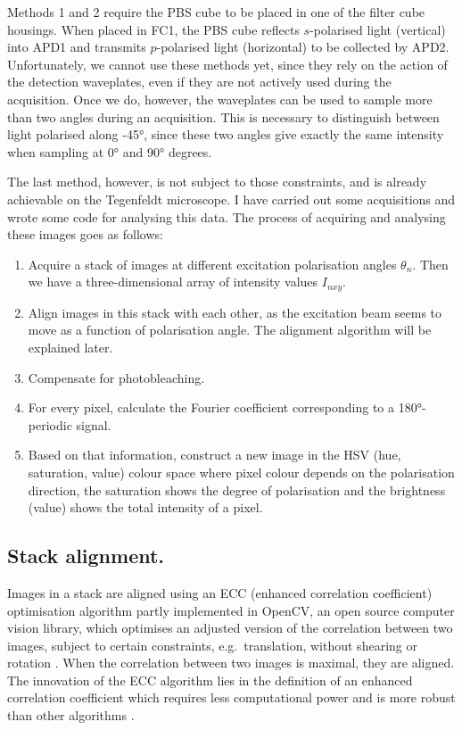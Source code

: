 Methods 1 and 2 require the PBS cube to be placed in one of the filter cube housings. When placed in FC1, the PBS cube reflects $ s $-polarised light (vertical) into APD1 and transmits $ p $-polarised light (horizontal) to be collected by APD2. Unfortunately, we cannot use these methods yet, since they rely on the action of the detection waveplates, even if they are not actively used during the acquisition. Once we do, however, the waveplates can be used to sample more than two angles during an acquisition. This is necessary to distinguish between light polarised along \ang{+-45}, since these two angles give exactly the same intensity when sampling at \ang{0} and \ang{90} degrees.

The last method, however, is not subject to those constraints, and is already achievable on the Tegenfeldt microscope. I have carried out some acquisitions and wrote some code for analysing this data. The process of acquiring and analysing these images goes as follows:
\begin{enumerate}
	\item Acquire a stack of images at different excitation polarisation angles $ \theta_n $. Then we have a three-dimensional array of intensity values $ I_{nxy} $.
	\item Align images in this stack with each other, as the excitation beam seems to move as a function of polarisation angle. The alignment algorithm will be explained later.
	\item Compensate for photobleaching.
	\item For every pixel, calculate the Fourier coefficient corresponding to a \ang{180}-periodic signal.
	\item Based on that information, construct a new image in the HSV (hue, saturation, value) colour space where pixel colour depends on the polarisation direction, the saturation shows the degree of polarisation and the brightness (value) shows the total intensity of a pixel. 

\end{enumerate}

\subsection{Stack alignment.} Images in a stack are aligned using an ECC (enhanced correlation coefficient) optimisation algorithm partly implemented in OpenCV, an open source computer vision library, which optimises an adjusted version of the correlation between two images, subject to certain constraints, e.g.~translation, without shearing or rotation \cite{Evangelidis2008}. When the correlation between two images is maximal, they are aligned. The innovation of the ECC algorithm lies in the definition of an enhanced correlation coefficient which requires less computational power and is more robust than other algorithms \cite{Evangelidis2008}. 

